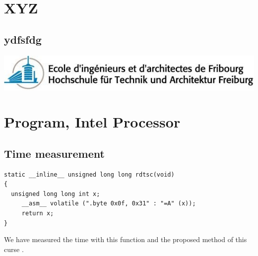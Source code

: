 \documentclass[a4paper,10pt]{article}
\begin{document}
	
	
	
	
	\section{XYZ }
		\subsection{ydfsfdg}
		\begin{center}
					 \includegraphics[width=1.1\textwidth]{./images/model/eifr-logo}
		\end{center}
		
		\section{ Program,  Intel  Processor }
			\subsection{Time measurement}
		\begin{lstlisting} 
static __inline__ unsigned long long rdtsc(void)
{
  unsigned long long int x;
     __asm__ volatile (".byte 0x0f, 0x31" : "=A" (x));
     return x;
}
		\end{lstlisting}
		We have measured the time with this function and the proposed method of this curse . 
		

				
\end{document}
